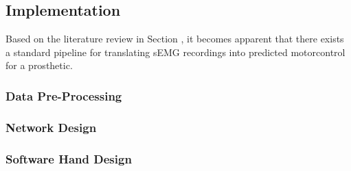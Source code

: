 \documentclass[../main.tex]{subfiles}
\begin{document}
\subsection{Implementation}

Based on the literature review in Section \label{sec:literature}, it becomes apparent that there exists a standard pipeline for translating sEMG recordings into predicted motorcontrol for a prosthetic.




\subsubsection{Data Pre-Processing}
\subsubsection{Network Design}
\subsubsection{Software Hand Design}
\end{document}
